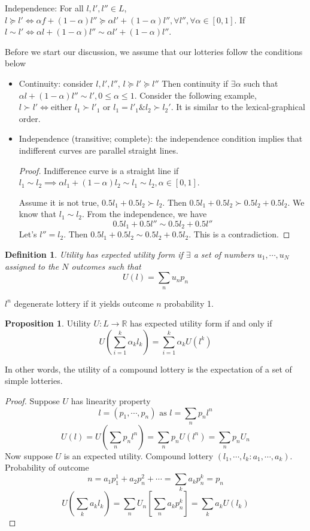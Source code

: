 \documentclass[11pt, a4paper, oneside]{article}
\newtheorem{mydef}{Definition}
\theoremstyle{definition}
\newtheorem{myprop}{Proposition}
\theoremstyle{proposition}
\theoremstyle{corollary}
\theoremstyle{lemma}
\theoremstyle{theorem}
\begin{document}
Independence: For all $l, l', l'' \in L$, $l \succeq l' \iff \alpha f +(1 -\alpha)l'' \succeq \alpha l' + (1-\alpha)l'', \forall l'', \forall \alpha \in [0, 1]$. If $l \sim l' \iff \alpha l + (1 - \alpha) l'' \sim \alpha l' + (1- \alpha)l''$. 

Before we start our discussion, we assume that our lotteries follow the conditions below
\begin{itemize}
\item Continuity: consider $l, l', l''$, $l \succeq l' \succeq l''$ Then continuity if $\exists \alpha$ such that $\alpha l + (1-\alpha)l'' \sim l', 0\leq \alpha \leq 1$. 
Consider the following example, $l \succ l' \iff \text{either } l_1 \succ l'_1 \text{ or } l_1 = l'_1 \& l_2\succ l_2'$. It is similar to the lexical-graphical order. 
\item Independence (transitive; complete): the independence condition implies that indifferent curves are parallel straight lines. 
\begin{proof}
Indifference curve is a straight line if $l_1\sim l_2 \implies \alpha l_1 + (1- \alpha) l_2 \sim l_1 \sim l_2, \alpha \in [0, 1]$. 

Assume it is not true, $0.5l_1 + 0.5l_2 \succ l_2$. Then $0.5l_1+0.5l_2 \succ 0.5l_2+0.5l_2$. We know that $l_1 \sim l_2$. From the independence, we have
$$0.5l_1+0.5l'' \sim 0.5l_2 + 0.5l''$$ Let's $l'' =l_2$. Then $0.5 l_1+0.5l_2 \sim 0.5l_2 +0.5l_2$. This is a contradiction.
\end{proof}
\end{itemize} 

\begin{mydef}
Utility has expected utility form if $\exists$ a set of numbers $u_1, \cdots, u_N$ assigned to the $N$ outcomes such that $$U(l) = \sum_n u_n p_n$$
\end{mydef}

$l^n$ degenerate lottery if it yields outcome $n$ probability 1.

\begin{myprop}
Utility $U: L \to \mathbb{R}$ has expected utility form if and only if
$$U\left(\sum_{i=1}^k\alpha_k l_k\right) = \sum_{i=1}^k\alpha_k U(l^k)$$

In other words, the utility of a compound lottery is the expectation of a set of simple lotteries. 
\end{myprop}

\begin{proof}
Suppose $U$ has linearity property
$$l = (p_1, \cdots, p_n) \text{ as } l = \sum_n p_nl^n$$ 
$$U(l) = U(\sum_n p_nl^n) = \sum_n p_nU(l^n) = \sum_n p_n U_n$$
Now suppose $U$ is an expected utility. Compound lottery $(l_1, \cdots, l_k: a_1, \cdots, a_k)$. Probability of outcome $$n = a_1 p^1_1 + a_2p_n^2+ \cdots = \sum_ka_k p_n^k = p_n$$
$$U(\sum_k a_k l_k) = \sum_n U_n\left[\sum_n a_kp_n^k\right]  = \sum_k a_k U(l_k)$$
\end{proof}
\end{document}
